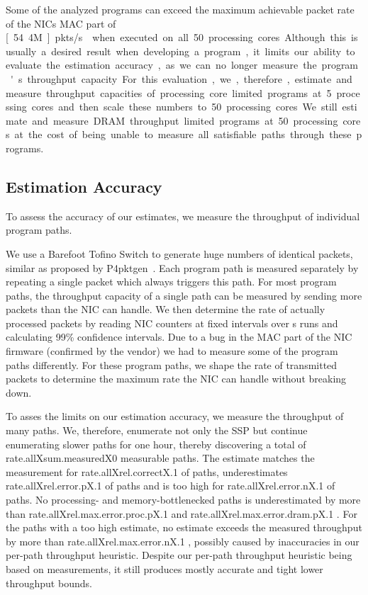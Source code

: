 \documentclass[10pt,letterpaper,sigconf,anonymous,nonacm,screen]{acmart}
\newcommand{\afblock}[1]{\noindent{\textbf{#1.}}}
\newcommand{\mdata}[3]{%
	\csname #1X#2X#3\endcsname%
}
\newcommand{\maclimit}[0]{%
	\unit[54.4M]{pkts/s}%
}
\newcommand{\removeunit}[1]{%
	{%
		\renewcommand{\unit}[2][]{##1}%
		#1%
	}%
}
\begin{document}
Some of the analyzed programs can exceed the maximum achievable packet rate of the NICs MAC part of \maclimit{} when executed on all 50~processing cores.
Although this is usually a desired result when developing a program, it limits our ability to evaluate the estimation accuracy, as we can no longer measure the program's throughput capacity.
For this evaluation, we, therefore, estimate and measure throughput capacities of processing core limited programs at 5 processing cores and then scale these numbers to 50 processing cores.
We still estimate and measure DRAM throughput limited programs at 50 processing cores at the cost of being unable to measure all satisfiable paths through these programs.



\subsection{Estimation Accuracy}
\label{subsec:estimation-accuracy}

To assess the accuracy of our estimates, we measure the throughput of individual program paths.

\afblock{Testbed}
We use a Barefoot Tofino Switch to generate huge numbers of identical packets, similar as proposed by P4pktgen~\cite{p4pktgen}.
Each program path is measured separately by repeating a single packet which always triggers this path.
For most program paths, the throughput capacity of a single path can be measured by sending more packets than the NIC can handle.
We then determine the rate of actually processed packets by reading NIC counters at fixed intervals over \unit[30]{s} runs and calculating 99\% confidence intervals.
Due to a bug in the MAC part of the NIC firmware (confirmed by the vendor) we had to measure some of the program paths differently.
For these program paths, we shape the rate of transmitted packets to determine the maximum rate the NIC can handle without breaking down.

\afblock{Per-Path Accuracy}
To asses the limits on our estimation accuracy, we measure the throughput of many paths.
We, therefore, enumerate not only the \ac{SSP} but continue enumerating slower paths for one hour, thereby discovering a total of \removeunit{\mdata{rate.all}{sum.measured}{0}} measurable paths.
The estimate matches the measurement for \mdata{rate.all}{rel.correct}{.1} of paths, underestimates \mdata{rate.all}{rel.error.p}{.1} of paths and is too high for \mdata{rate.all}{rel.error.n}{.1} of paths.
No  processing- and memory-bottlenecked paths is underestimated by more than \mdata{rate.all}{rel.max.error.proc.p}{.1} and \mdata{rate.all}{rel.max.error.dram.p}{.1}.
For the paths with a too high estimate, no estimate exceeds the measured throughput by more than \mdata{rate.all}{rel.max.error.n}{.1}, possibly caused by inaccuracies in our per-path throughput heuristic.
Despite our per-path throughput heuristic being based on measurements, it still produces mostly accurate and tight lower throughput bounds.
\end{document}
